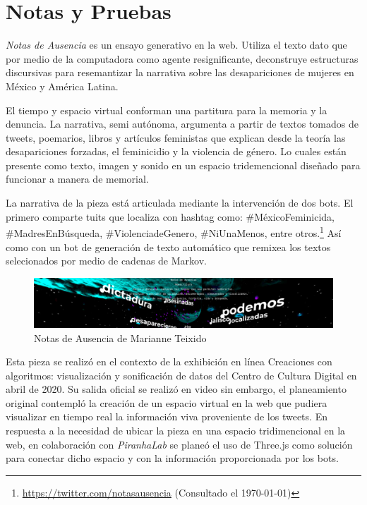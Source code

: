 
\section*{Notas y Pruebas} %


\textit{Notas de Ausencia} \citep{notasdeausencia} es un ensayo generativo en la web. Utiliza el texto dato que por medio de la computadora como agente resignificante, deconstruye estructuras discursivas para resemantizar la narrativa sobre las desapariciones de mujeres en México y América Latina.

El tiempo y espacio virtual conforman una partitura para la memoria y la denuncia. La narrativa, semi autónoma, argumenta a partir de textos tomados de tweets, poemarios, libros y artículos feministas que explican desde la teoría las desapariciones forzadas, el feminicidio y la violencia de género. Lo cuales están presente como texto, imagen y sonido en un espacio tridemencional diseñado para funcionar a manera de memorial.

La narrativa de la pieza está articulada mediante la intervención de dos bots. El primero comparte tuits que localiza con hashtag como: \#MéxicoFeminicida, \#MadresEnBúsqueda, \#ViolenciadeGenero, \#NiUnaMenos, entre otros.\footnote{\url{https://twitter.com/notasausencia} (Consultado el \today)} Así como con un bot de generación de texto automático que remixea los textos selecionados por medio de cadenas de Markov.

\begin{figure}[H]
  \includegraphics[width=\textwidth]{img/notas.png}
  \caption{Notas de Ausencia de Marianne Teixido}
\end{figure}

Esta pieza se realizó en el contexto de la exhibición en línea Creaciones con algoritmos: visualización y sonificación de datos del Centro de Cultura Digital en abril de 2020. Su salida oficial se realizó en video sin embargo, el planeamiento original contempló la creación de un espacio virtual en la web que pudiera visualizar en tiempo real la información viva proveniente de los tweets. 
En respuesta a la necesidad de ubicar la pieza en una espacio tridimencional en la web, en colaboración con \textit{PiranhaLab} se planeó el uso de Three.js como solución para conectar dicho espacio y con la información proporcionada por los bots. 

